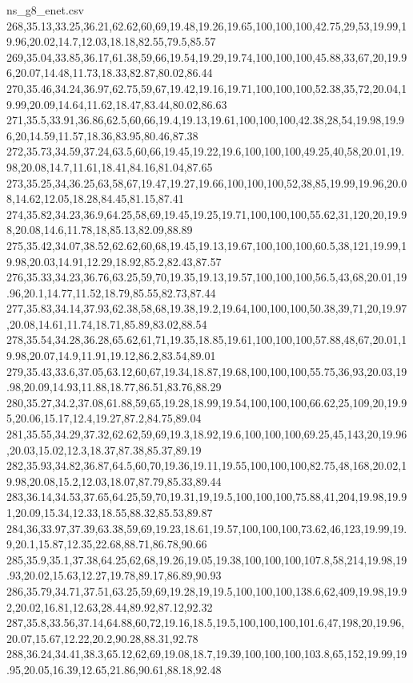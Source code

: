 \begin{filecontents*}[overwrite]{ns_g8_enet.csv}
268,35.13,33.25,36.21,62.62,60,69,19.48,19.26,19.65,100,100,100,42.75,29,53,19.99,19.96,20.02,14.7,12.03,18.18,82.55,79.5,85.57
269,35.04,33.85,36.17,61.38,59,66,19.54,19.29,19.74,100,100,100,45.88,33,67,20,19.96,20.07,14.48,11.73,18.33,82.87,80.02,86.44
270,35.46,34.24,36.97,62.75,59,67,19.42,19.16,19.71,100,100,100,52.38,35,72,20.04,19.99,20.09,14.64,11.62,18.47,83.44,80.02,86.63
271,35.5,33.91,36.86,62.5,60,66,19.4,19.13,19.61,100,100,100,42.38,28,54,19.98,19.96,20,14.59,11.57,18.36,83.95,80.46,87.38
272,35.73,34.59,37.24,63.5,60,66,19.45,19.22,19.6,100,100,100,49.25,40,58,20.01,19.98,20.08,14.7,11.61,18.41,84.16,81.04,87.65
273,35.25,34,36.25,63,58,67,19.47,19.27,19.66,100,100,100,52,38,85,19.99,19.96,20.08,14.62,12.05,18.28,84.45,81.15,87.41
274,35.82,34.23,36.9,64.25,58,69,19.45,19.25,19.71,100,100,100,55.62,31,120,20,19.98,20.08,14.6,11.78,18,85.13,82.09,88.89
275,35.42,34.07,38.52,62.62,60,68,19.45,19.13,19.67,100,100,100,60.5,38,121,19.99,19.98,20.03,14.91,12.29,18.92,85.2,82.43,87.57
276,35.33,34.23,36.76,63.25,59,70,19.35,19.13,19.57,100,100,100,56.5,43,68,20.01,19.96,20.1,14.77,11.52,18.79,85.55,82.73,87.44
277,35.83,34.14,37.93,62.38,58,68,19.38,19.2,19.64,100,100,100,50.38,39,71,20,19.97,20.08,14.61,11.74,18.71,85.89,83.02,88.54
278,35.54,34.28,36.28,65.62,61,71,19.35,18.85,19.61,100,100,100,57.88,48,67,20.01,19.98,20.07,14.9,11.91,19.12,86.2,83.54,89.01
279,35.43,33.6,37.05,63.12,60,67,19.34,18.87,19.68,100,100,100,55.75,36,93,20.03,19.98,20.09,14.93,11.88,18.77,86.51,83.76,88.29
280,35.27,34.2,37.08,61.88,59,65,19.28,18.99,19.54,100,100,100,66.62,25,109,20,19.95,20.06,15.17,12.4,19.27,87.2,84.75,89.04
281,35.55,34.29,37.32,62.62,59,69,19.3,18.92,19.6,100,100,100,69.25,45,143,20,19.96,20.03,15.02,12.3,18.37,87.38,85.37,89.19
282,35.93,34.82,36.87,64.5,60,70,19.36,19.11,19.55,100,100,100,82.75,48,168,20.02,19.98,20.08,15.2,12.03,18.07,87.79,85.33,89.44
283,36.14,34.53,37.65,64.25,59,70,19.31,19,19.5,100,100,100,75.88,41,204,19.98,19.91,20.09,15.34,12.33,18.55,88.32,85.53,89.87
284,36,33.97,37.39,63.38,59,69,19.23,18.61,19.57,100,100,100,73.62,46,123,19.99,19.9,20.1,15.87,12.35,22.68,88.71,86.78,90.66
285,35.9,35.1,37.38,64.25,62,68,19.26,19.05,19.38,100,100,100,107.8,58,214,19.98,19.93,20.02,15.63,12.27,19.78,89.17,86.89,90.93
286,35.79,34.71,37.51,63.25,59,69,19.28,19,19.5,100,100,100,138.6,62,409,19.98,19.92,20.02,16.81,12.63,28.44,89.92,87.12,92.32
287,35.8,33.56,37.14,64.88,60,72,19.16,18.5,19.5,100,100,100,101.6,47,198,20,19.96,20.07,15.67,12.22,20.2,90.28,88.31,92.78
288,36.24,34.41,38.3,65.12,62,69,19.08,18.7,19.39,100,100,100,103.8,65,152,19.99,19.95,20.05,16.39,12.65,21.86,90.61,88.18,92.48

\end{filecontents*}
